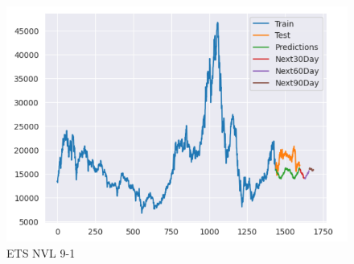 \documentclass[conference]{IEEEtran}
\begin{document}
\begin{enumerate}
\begin{figure}[htbp]
\begin{minipage}{0.23\textwidth}
    \includegraphics[width=1\textwidth]{experiment/ets/TEAM4_ETS_DXG_9_1.png}
    \caption{ETS NVL 9-1}
    \label{fig:nvl_histogram}
    \end{minipage}
\end{figure}


\begin{figure}[htbp]

\end{figure}
\end{enumerate}
\end{document}
